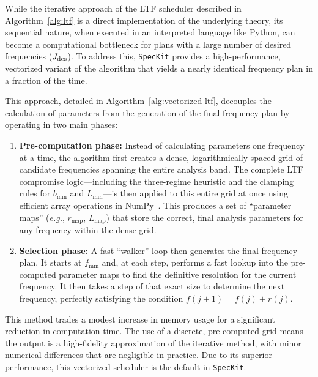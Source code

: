 \documentclass[final, 5p, times, twocolumn, number, sort&compress]{elsarticle}
\newcommand{\eg}{\textit{e.g.}}
\newcommand{\speckit}{\texttt{SpecKit}}
\begin{document}
While the iterative approach of the LTF scheduler described in Algorithm~\ref{alg:ltf} is a direct implementation of the underlying theory, its sequential nature, when executed in an interpreted language like Python, can become a computational bottleneck for plans with a large number of desired frequencies ($J_{\rm des}$). To address this, \speckit{} provides a high-performance, vectorized variant of the algorithm that yields a nearly identical frequency plan in a fraction of the time.

This approach, detailed in Algorithm~\ref{alg:vectorized-ltf}, decouples the calculation of parameters from the generation of the final frequency plan by operating in two main phases:
\begin{enumerate}
    \item \textbf{Pre-computation phase:} Instead of calculating parameters one frequency at a time, the algorithm first creates a dense, logarithmically spaced grid of candidate frequencies spanning the entire analysis band. The complete LTF compromise logic---including the three-regime heuristic and the clamping rules for $b_{\min}$ and $L_{\min}$---is then applied to this entire grid at once using efficient array operations in NumPy~\cite{Harris2020}. This produces a set of ``parameter maps'' (\eg, $r_{\text{map}}$, $L_{\text{map}}$) that store the correct, final analysis parameters for any frequency within the dense grid.
    \item \textbf{Selection phase:} A fast ``walker'' loop then generates the final frequency plan. It starts at $f_{\min}$ and, at each step, performs a fast lookup into the pre-computed parameter maps to find the definitive resolution for the current frequency. It then takes a step of that exact size to determine the next frequency, perfectly satisfying the condition $f(j+1) = f(j) + r(j)$.
\end{enumerate}
This method trades a modest increase in memory usage for a significant reduction in computation time. The use of a discrete, pre-computed grid means the output is a high-fidelity approximation of the iterative method, with minor numerical differences that are negligible in practice. Due to its superior performance, this vectorized scheduler is the default in \speckit{}.
\end{document}
